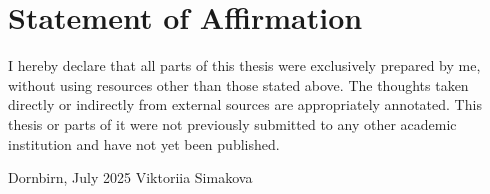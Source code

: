 \documentclass[a4paper,12pt,twoside]{scrreprt}
\begin{document}









\clearpage
{}
{}
\printbibliography


\chapter*{Statement of Affirmation}
I hereby declare that all parts of this thesis were exclusively prepared by me, without using resources other than those stated above. The thoughts taken directly or indirectly from external sources are appropriately annotated. This thesis or parts of it were not previously submitted to any other academic institution and have not yet been published.

\vspace{3cm}
\noindent
Dornbirn, July 2025 \hfill Viktoriia Simakova
\end{document}

